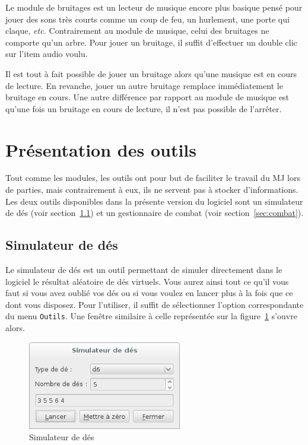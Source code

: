 \documentclass[a4paper,12pt]{article}
\newcommand*{\interfaceitem}[1]{\texttt{#1}}
\begin{document}
Le module de bruitages est un lecteur de musique encore plus basique pensé pour jouer des sons très courts comme un coup de feu, un hurlement, une porte qui claque, \emph{etc.}
Contrairement au module de musique, celui des bruitages ne comporte qu'un arbre.
Pour jouer un bruitage, il suffit d'effectuer un double clic sur l'item audio voulu.

Il est tout à fait possible de jouer un bruitage alors qu'une musique est en cours de lecture.
En revanche, jouer un autre bruitage remplace immédiatement le bruitage en cours.
Une autre différence par rapport au module de musique est qu'une fois un bruitage en cours de lecture, il n'est pas possible de l'arrêter.

\section{Présentation des outils}
\label{sec:outils}

Tout comme les modules, les outils ont pour but de faciliter le travail du MJ lors de parties, mais contrairement à eux, ils ne servent pas à stocker d'informations.
Les deux outils disponibles dans la présente version du logiciel sont un simulateur de dés (voir section~\ref{sec:des}) et un gestionnaire de combat (voir section~\ref{sec:combat}).

\subsection{Simulateur de dés}
\label{sec:des}

Le simulateur de dés est un outil permettant de simuler directement dans le logiciel le résultat aléatoire de dés virtuels.
Vous aurez ainsi tout ce qu'il vous faut si vous avez oublié vos dés ou si vous voulez en lancer plus à la fois que ce dont vous disposez.
Pour l'utiliser, il suffit de sélectionner l'option correspondante du menu \interfaceitem{Outils}.
Une fenêtre similaire à celle représentée sur la figure~\ref{simulateur_des} s'ouvre alors.
\begin{figure}[ht]
    \centerline{\includegraphics[width=0.6\textwidth]{simulateur_de_des}}
    \caption{Simulateur de dés}
    \label{simulateur_des}
\end{figure}
\end{document}
